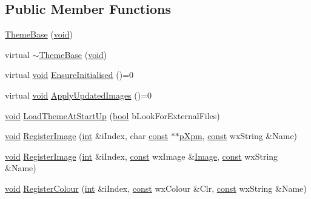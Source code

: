\subsection*{Public Member Functions}
\begin{DoxyCompactItemize}
\item 
\hyperlink{class_theme_base_a6c22d36467b85f1d804d3058b0cc9a00}{Theme\+Base} (\hyperlink{sound_8c_ae35f5844602719cf66324f4de2a658b3}{void})
\item 
virtual \hyperlink{class_theme_base_af1391455fcfc18a713e5b73d36593ad7}{$\sim$\+Theme\+Base} (\hyperlink{sound_8c_ae35f5844602719cf66324f4de2a658b3}{void})
\item 
virtual \hyperlink{sound_8c_ae35f5844602719cf66324f4de2a658b3}{void} \hyperlink{class_theme_base_ac9893283dfa77242c2fdbb9776b7fb37}{Ensure\+Initialised} ()=0
\item 
virtual \hyperlink{sound_8c_ae35f5844602719cf66324f4de2a658b3}{void} \hyperlink{class_theme_base_a69a233506c1c387600f009941ccb4af4}{Apply\+Updated\+Images} ()=0
\item 
\hyperlink{sound_8c_ae35f5844602719cf66324f4de2a658b3}{void} \hyperlink{class_theme_base_a530544991bcc76112aaba8edda83133b}{Load\+Theme\+At\+Start\+Up} (\hyperlink{mac_2config_2i386_2lib-src_2libsoxr_2soxr-config_8h_abb452686968e48b67397da5f97445f5b}{bool} b\+Look\+For\+External\+Files)
\item 
\hyperlink{sound_8c_ae35f5844602719cf66324f4de2a658b3}{void} \hyperlink{class_theme_base_a0b0c72c570dbf2470a4aaa7630cd902b}{Register\+Image} (\hyperlink{xmltok_8h_a5a0d4a5641ce434f1d23533f2b2e6653}{int} \&i\+Index, char \hyperlink{getopt1_8c_a2c212835823e3c54a8ab6d95c652660e}{const} $\ast$$\ast$\hyperlink{_track_panel_8cpp_a63096d6582a75d647088db680060c12a}{p\+Xpm}, \hyperlink{getopt1_8c_a2c212835823e3c54a8ab6d95c652660e}{const} wx\+String \&Name)
\item 
\hyperlink{sound_8c_ae35f5844602719cf66324f4de2a658b3}{void} \hyperlink{class_theme_base_a7deaded40a84941a4249d8178ddc9458}{Register\+Image} (\hyperlink{xmltok_8h_a5a0d4a5641ce434f1d23533f2b2e6653}{int} \&i\+Index, \hyperlink{getopt1_8c_a2c212835823e3c54a8ab6d95c652660e}{const} wx\+Image \&\hyperlink{class_theme_base_a2243773f651603c2855bd3562801d680}{Image}, \hyperlink{getopt1_8c_a2c212835823e3c54a8ab6d95c652660e}{const} wx\+String \&Name)
\item 
\hyperlink{sound_8c_ae35f5844602719cf66324f4de2a658b3}{void} \hyperlink{class_theme_base_a0e9c26f5a9600c9f5448633bb5262ae0}{Register\+Colour} (\hyperlink{xmltok_8h_a5a0d4a5641ce434f1d23533f2b2e6653}{int} \&i\+Index, \hyperlink{getopt1_8c_a2c212835823e3c54a8ab6d95c652660e}{const} wx\+Colour \&Clr, \hyperlink{getopt1_8c_a2c212835823e3c54a8ab6d95c652660e}{const} wx\+String \&Name)
$$
\end{DoxyCompactItemize}
